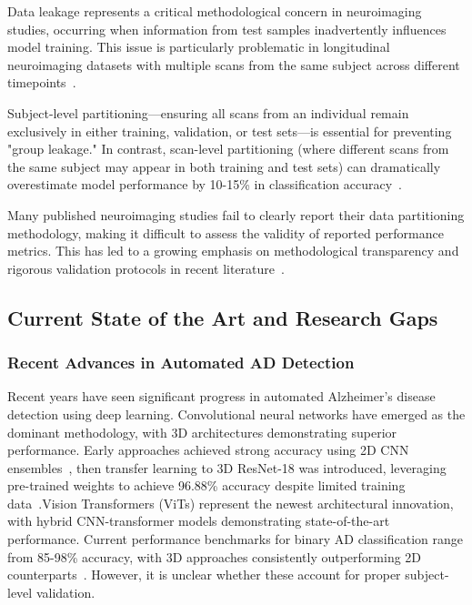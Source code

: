 \documentclass[12pt, a4paper]{article}
\begin{document}
Data leakage represents a critical methodological concern in neuroimaging studies, occurring when information from test samples inadvertently influences model training. This issue is particularly problematic in longitudinal neuroimaging datasets with multiple scans from the same subject across different timepoints~\cite{davatzikos2019machine}.

Subject-level partitioning—ensuring all scans from an individual remain exclusively in either training, validation, or test sets—is essential for preventing "group leakage." In contrast, scan-level partitioning (where different scans from the same subject may appear in both training and test sets) can dramatically overestimate model performance by 10-15\% in classification accuracy~\cite{davatzikos2019machine}.

Many published neuroimaging studies fail to clearly report their data partitioning methodology, making it difficult to assess the validity of reported performance metrics. This has led to a growing emphasis on methodological transparency and rigorous validation protocols in recent literature~\cite{davatzikos2019machine}.

\subsection{Current State of the Art and Research Gaps}

\subsubsection{Recent Advances in Automated AD Detection}

Recent years have seen significant progress in automated Alzheimer's disease detection using deep learning. Convolutional neural networks have emerged as the dominant methodology, with 3D architectures demonstrating superior performance. Early approaches achieved strong accuracy using 2D CNN ensembles~\cite{farooq2017deep}, then transfer learning to 3D ResNet-18 was introduced, leveraging pre-trained weights to achieve 96.88\% accuracy despite limited training data~\cite{ebrahimi2020introducing}.Vision Transformers (ViTs) represent the newest architectural innovation, with hybrid CNN-transformer models demonstrating state-of-the-art performance. Current performance benchmarks for binary AD classification range from 85-98\% accuracy, with 3D approaches consistently outperforming 2D counterparts~\cite{saikia2024alzheimer,mubonanyikuzo2025detection}. However, it is unclear whether these account for proper subject-level validation.
\end{document}
